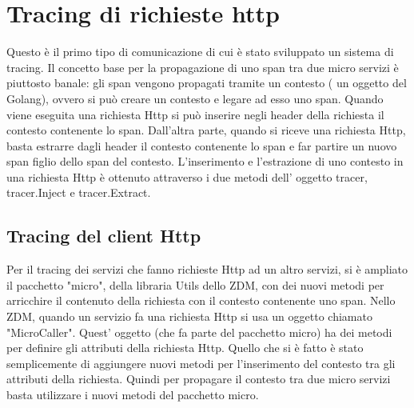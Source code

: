 \documentclass[a4paper,12pt,titlepage,italian,openany]{report}
\begin{document}
\section{Tracing di richieste http}
Questo è il primo tipo di comunicazione di cui è stato sviluppato un sistema di tracing. Il concetto base per la propagazione di uno span tra due micro servizi è piuttosto banale: gli span vengono propagati tramite un contesto ( un oggetto del Golang), ovvero si può  creare un contesto e legare ad esso uno span. Quando viene eseguita una richiesta Http si può inserire negli header della richiesta il contesto contenente lo span. 
Dall'altra parte, quando si riceve una richiesta Http, basta estrarre dagli header il contesto contenente lo span e far partire un nuovo span figlio dello span del contesto. 
L'inserimento e l'estrazione di uno contesto in una richiesta Http è ottenuto attraverso i due metodi dell' oggetto tracer, tracer.Inject e tracer.Extract.
\subsection{Tracing del client Http}
Per il tracing dei servizi che fanno richieste Http ad un altro servizi, si è ampliato il pacchetto "micro", della libraria Utils dello ZDM\cite{zdm:1}, con dei nuovi metodi per arricchire il contenuto della richiesta con il contesto contenente uno span.
Nello ZDM\cite{zdm:1}, quando un servizio fa una richiesta Http si usa un oggetto chiamato "MicroCaller". Quest' oggetto (che fa parte del pacchetto micro) ha dei metodi per definire gli attributi della richiesta Http. Quello che si è fatto è stato semplicemente di aggiungere nuovi metodi per l'inserimento 
del contesto tra gli attributi della richiesta. Quindi per propagare il contesto tra due micro servizi basta utilizzare i nuovi metodi del pacchetto micro.
\end{document}
